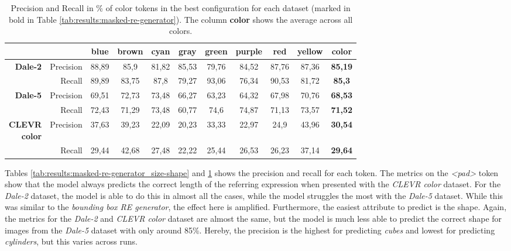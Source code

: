\begin{table}[ht]
    \centering
    \begin{tabular}{rr|cccccccc|c}
        \toprule
                                         &             & {blue}  & {brown} & {cyan}  & {gray}  & {green} & {purple} & {red}   & {yellow} & \textbf{color} \\\midrule
        \multirow{2}{*}{\textbf{Dale-2}} & {Precision} & {88,89} & {85,9}  & {81,82} & {85,53} & {79,76} & {84,52}  & {87,76} & {87,36}  & \textbf{85,19} \\
                                         & {Recall}    & {89,89} & {83,75} & {87,8}  & {79,27} & {93,06} & {76,34}  & {90,53} & {81,72}  & \textbf{85,3}  \\\midrule
        \multirow{2}{*}{\textbf{Dale-5}} & {Precision} & {69,51} & {72,73} & {73,48} & {66,27} & {63,23} & {64,32}  & {67,98} & {70,76}  & \textbf{68,53} \\
                                         & {Recall}    & {72,43} & {71,29} & {73,48} & {60,77} & {74,6}  & {74,87}  & {71,13} & {73,57}  & \textbf{71,52} \\\midrule
        \multirowcell{2}[0pt][r]{\textbf{CLEVR}                                                                                                           \\\textbf{color}} & {Precision}           & {37,63} & {39,23} & {22,09} & {20,23} & {33,33} & {22,97} & {24,9} & {43,96} & \textbf{30,54} \\
                                         & {Recall}    & {29,44} & {42,68} & {27,48} & {22,22} & {25,44} & {26,53}  & {26,23} & {37,14}  & \textbf{29,64} \\
        \bottomrule
    \end{tabular}
    \caption{Precision and Recall in \% of color tokens in the best configuration for each dataset (marked in bold in Table \ref{tab:results:masked-re-generator}). The column \textbf{color} shows the average across all colors.}
    \label{tab:results:masked-re-generator_color}
\end{table}

Tables \ref{tab:results:masked-re-generator_size-shape} and \ref{tab:results:masked-re-generator_color} shows the precision and recall for each token.
The metrics on the \emph{<pad>} token show that the model always predicts the correct length of the referring expression when presented with the \emph{CLEVR color} dataset.
For the \emph{Dale-2} dataset, the model is able to do this in almost all the cases, while the model struggles the most with the \emph{Dale-5} dataset.
While this was similar to the \emph{bounding box RE generator}, the effect here is amplified.
Furthermore, the easiest attribute to predict is the shape.
Again, the metrics for the \emph{Dale-2} and \emph{CLEVR color} dataset are almost the same, but the model is much less able to predict the correct shape for images from the \emph{Dale-5} dataset with only around 85\%.
Hereby, the precision is the highest for predicting \emph{cubes} and lowest for predicting \emph{cylinders}, but this varies across runs.


